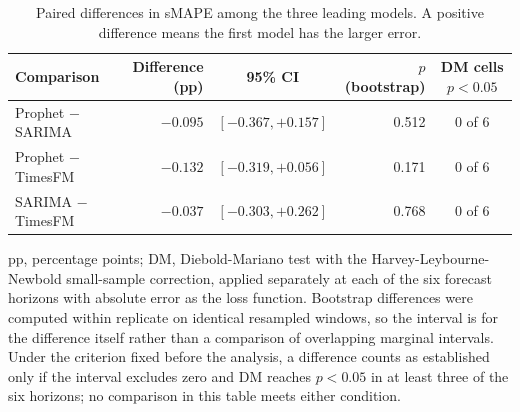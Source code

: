 \begin{table}[htbp]
\centering
\small
\caption{Paired differences in sMAPE among the three leading models. A positive
difference means the first model has the larger error.}
\label{tab:pares}
\begin{tabular}{lrcrc}
\toprule
Comparison & Difference (pp) & 95\% CI & $p$ (bootstrap) & DM cells $p<0.05$ \\
\midrule
Prophet $-$ SARIMA & $-0.095$ & $[-0.367, +0.157]$ & 0.512 & 0 of 6 \\
Prophet $-$ TimesFM & $-0.132$ & $[-0.319, +0.056]$ & 0.171 & 0 of 6 \\
SARIMA $-$ TimesFM & $-0.037$ & $[-0.303, +0.262]$ & 0.768 & 0 of 6 \\
\bottomrule
\end{tabular}

\vspace{0.5em}
\begin{minipage}{\textwidth}
\footnotesize
pp, percentage points; DM, Diebold-Mariano test with the Harvey-Leybourne-Newbold
small-sample correction, applied separately at each of the six forecast horizons with
absolute error as the loss function. Bootstrap differences were computed within
replicate on identical resampled windows, so the interval is for the difference itself
rather than a comparison of overlapping marginal intervals. Under the criterion fixed
before the analysis, a difference counts as established only if the interval excludes
zero and DM reaches $p<0.05$ in at least three of the six horizons; no comparison in
this table meets either condition.
\end{minipage}
\end{table}

